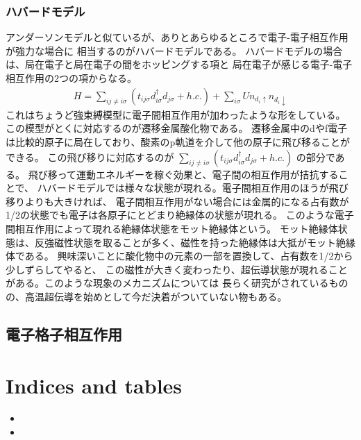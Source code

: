 \documentclass[letterpaper,10pt,dvipdfmx]{sphinxhowto}
\begin{document}
\subsubsection{ハバードモデル}
\label{\detokenize{index:id5}}
アンダーソンモデルと似ているが、ありとあらゆるところで電子-電子相互作用が強力な場合に
相当するのがハバードモデルである。
ハバードモデルの場合は、局在電子と局在電子の間をホッピングする項と
局在電子が感じる電子-電子相互作用の2つの項からなる。
\begin{equation*}
\begin{split}H=\sum_{i j\neq i\sigma}( t_{ij\sigma} d_{i\sigma}^\dagger d_{j\sigma}+h.c.) +\sum_{i\sigma}Un_{d_i\uparrow}n_{d_i\downarrow}\end{split}
\end{equation*}
これはちょうど強束縛模型に電子間相互作用が加わったような形をしている。
この模型がとくに対応するのが遷移金属酸化物である。
遷移金属中のdやf電子は比較的原子に局在しており、酸素のp軌道を介して他の原子に飛び移ることができる。
この飛び移りに対応するのが
\(\sum_{i j\neq i\sigma}( t_{ij\sigma} d_{i\sigma}^\dagger d_{j\sigma}+h.c.)\)
の部分である。
飛び移って運動エネルギーを稼ぐ効果と、電子間の相互作用が拮抗することで、
ハバードモデルでは様々な状態が現れる。電子間相互作用のほうが飛び移りよりも大きければ、
電子間相互作用がない場合には金属的になる占有数が1/2の状態でも電子は各原子にとどまり絶縁体の状態が現れる。
このような電子間相互作用によって現れる絶縁体状態をモット絶縁体という。
モット絶縁体状態は、反強磁性状態を取ることが多く、磁性を持った絶縁体は大抵がモット絶縁体である。
興味深いことに酸化物中の元素の一部を置換して、占有数を1/2から少しずらしてやると、
この磁性が大きく変わったり、超伝導状態が現れることがある。このような現象のメカニズムについては
長らく研究がされているものの、高温超伝導を始めとして今だ決着がついていない物もある。


\subsection{電子格子相互作用}
\label{\detokenize{index:id6}}

\section{Indices and tables}
\label{\detokenize{index:indices-and-tables}}\begin{itemize}
\item {} 

\item {} 

\end{itemize}



\renewcommand{\indexname}{索引}
\printindex
\end{document}
